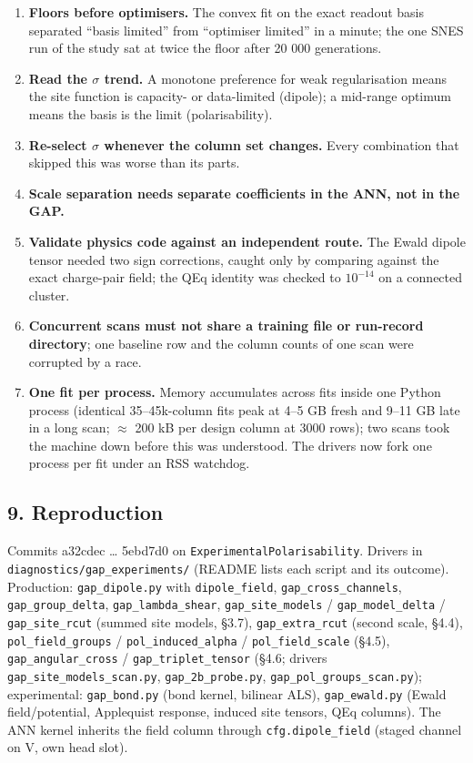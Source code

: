 \documentclass[
  10pt,
]{article}
\providecommand{\tightlist}{%
  \setlength{\itemsep}{0pt}\setlength{\parskip}{0pt}}
\providecommand{\tightlist}{\setlength{\itemsep}{0pt}\setlength{\parskip}{0pt}}
\begin{document}
\begin{enumerate}
\def\labelenumi{\arabic{enumi}.}
\tightlist
\item
  \textbf{Floors before optimisers.} The convex fit on the exact readout basis separated ``basis
  limited'' from ``optimiser limited'' in a minute; the one SNES run of the study sat at twice the
  floor after 20 000 generations.
\item
  \textbf{Read the \(\sigma\) trend.} A monotone preference for weak regularisation means the site
  function is capacity- or data-limited (dipole); a mid-range optimum means the basis is the limit
  (polarisability).
\item
  \textbf{Re-select \(\sigma\) whenever the column set changes.} Every combination that skipped this
  was worse than its parts.
\item
  \textbf{Scale separation needs separate coefficients in the ANN, not in the GAP.}
\item
  \textbf{Validate physics code against an independent route.} The Ewald dipole tensor needed two
  sign corrections, caught only by comparing against the exact charge-pair field; the QEq identity
  was checked to \(10^{-14}\) on a connected cluster.
\item
  \textbf{Concurrent scans must not share a training file or run-record directory}; one baseline row
  and the column counts of one scan were corrupted by a race.
\item
  \textbf{One fit per process.} Memory accumulates across fits inside one Python process (identical
  35--45k-column fits peak at 4--5 GB fresh and 9--11 GB late in a long scan; \(\approx\) 200 kB per
  design column at 3000 rows); two scans took the machine down before this was understood. The
  drivers now fork one process per fit under an RSS watchdog.
\end{enumerate}

\subsection{9. Reproduction}\label{reproduction}

Commits a32cdec \ldots{} 5ebd7d0 on \texttt{ExperimentalPolarisability}. Drivers in
\texttt{diagnostics/gap\_experiments/} (README lists each script and its outcome). Production:
\texttt{gap\_dipole.py} with \texttt{dipole\_field}, \texttt{gap\_cross\_channels},
\texttt{gap\_group\_delta}, \texttt{gap\_lambda\_shear}, \texttt{gap\_site\_models} /
\texttt{gap\_model\_delta} / \texttt{gap\_site\_rcut} (summed site models, §3.7),
\texttt{gap\_extra\_rcut} (second scale, §4.4), \texttt{pol\_field\_groups} /
\texttt{pol\_induced\_alpha} / \texttt{pol\_field\_scale} (§4.5), \texttt{gap\_angular\_cross} /
\texttt{gap\_triplet\_tensor} (§4.6; drivers \texttt{gap\_site\_models\_scan.py},
\texttt{gap\_2b\_probe.py}, \texttt{gap\_pol\_groups\_scan.py}); experimental: \texttt{gap\_bond.py}
(bond kernel, bilinear ALS), \texttt{gap\_ewald.py} (Ewald field/potential, Applequist response,
induced site tensors, QEq columns). The ANN kernel inherits the field column through
\texttt{cfg.dipole\_field} (staged channel on V, own head slot).
\end{document}
